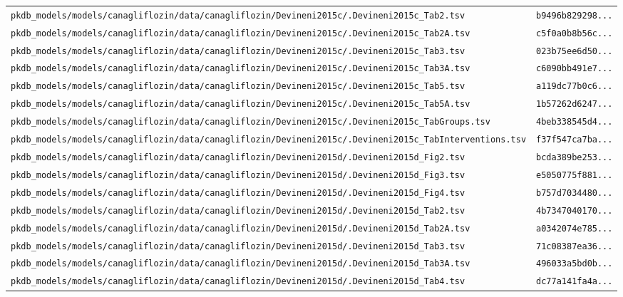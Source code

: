 \documentclass{article}
\begin{document}
\begin{longtable}{ll}
\texttt{pkdb\_models/models/canagliflozin/data/canagliflozin/Devineni2015c/.Devineni2015c\_Tab2.tsv} & \texttt{b9496b829298...} \\
\texttt{pkdb\_models/models/canagliflozin/data/canagliflozin/Devineni2015c/.Devineni2015c\_Tab2A.tsv} & \texttt{c5f0a0b8b56c...} \\
\texttt{pkdb\_models/models/canagliflozin/data/canagliflozin/Devineni2015c/.Devineni2015c\_Tab3.tsv} & \texttt{023b75ee6d50...} \\
\texttt{pkdb\_models/models/canagliflozin/data/canagliflozin/Devineni2015c/.Devineni2015c\_Tab3A.tsv} & \texttt{c6090bb491e7...} \\
\texttt{pkdb\_models/models/canagliflozin/data/canagliflozin/Devineni2015c/.Devineni2015c\_Tab5.tsv} & \texttt{a119dc77b0c6...} \\
\texttt{pkdb\_models/models/canagliflozin/data/canagliflozin/Devineni2015c/.Devineni2015c\_Tab5A.tsv} & \texttt{1b57262d6247...} \\
\texttt{pkdb\_models/models/canagliflozin/data/canagliflozin/Devineni2015c/.Devineni2015c\_TabGroups.tsv} & \texttt{4beb338545d4...} \\
\texttt{pkdb\_models/models/canagliflozin/data/canagliflozin/Devineni2015c/.Devineni2015c\_TabInterventions.tsv} & \texttt{f37f547ca7ba...} \\
\texttt{pkdb\_models/models/canagliflozin/data/canagliflozin/Devineni2015d/.Devineni2015d\_Fig2.tsv} & \texttt{bcda389be253...} \\
\texttt{pkdb\_models/models/canagliflozin/data/canagliflozin/Devineni2015d/.Devineni2015d\_Fig3.tsv} & \texttt{e5050775f881...} \\
\texttt{pkdb\_models/models/canagliflozin/data/canagliflozin/Devineni2015d/.Devineni2015d\_Fig4.tsv} & \texttt{b757d7034480...} \\
\texttt{pkdb\_models/models/canagliflozin/data/canagliflozin/Devineni2015d/.Devineni2015d\_Tab2.tsv} & \texttt{4b7347040170...} \\
\texttt{pkdb\_models/models/canagliflozin/data/canagliflozin/Devineni2015d/.Devineni2015d\_Tab2A.tsv} & \texttt{a0342074e785...} \\
\texttt{pkdb\_models/models/canagliflozin/data/canagliflozin/Devineni2015d/.Devineni2015d\_Tab3.tsv} & \texttt{71c08387ea36...} \\
\texttt{pkdb\_models/models/canagliflozin/data/canagliflozin/Devineni2015d/.Devineni2015d\_Tab3A.tsv} & \texttt{496033a5bd0b...} \\
\texttt{pkdb\_models/models/canagliflozin/data/canagliflozin/Devineni2015d/.Devineni2015d\_Tab4.tsv} & \texttt{dc77a141fa4a...} \\

\end{longtable}
\end{document}
